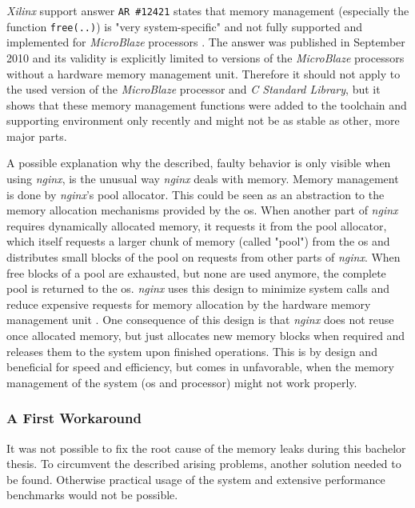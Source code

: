 \textit{Xilinx} support answer \texttt{AR \#12421} states that memory management (especially the function \texttt{free(..)}) is "very system-specific" and not fully supported and implemented for \textit{MicroBlaze} processors \cite{mbfree}. The answer was published in September 2010 and its validity is explicitly limited to versions of the \textit{MicroBlaze} processors without a hardware memory management unit. Therefore it should not apply to the used version of the \textit{MicroBlaze} processor and \textit{C Standard Library}, but it shows that these memory management functions were added to the toolchain and supporting environment only recently and might not be as stable as other, more major parts.

A possible explanation why the described, faulty behavior is only visible when using \textit{nginx}, is the unusual way \textit{nginx} deals with memory. Memory management is done by \textit{nginx}'s pool allocator. This could be seen as an abstraction to the memory allocation mechanisms provided by the \gls{os}. When another part of \textit{nginx} requires dynamically allocated memory, it requests it from the pool allocator, which itself requests a larger chunk of memory (called "pool") from the \gls{os} and distributes small blocks of the pool on requests from other parts of \textit{nginx}. When free blocks of a pool are exhausted, but none are used anymore, the complete pool is returned to the \gls{os}. \textit{nginx} uses this design to minimize system calls and reduce expensive requests for memory allocation by the hardware memory management unit \cite{aosa}. One consequence of this design is that \textit{nginx} does not reuse once allocated memory, but just allocates new memory blocks when required and releases them to the system upon finished operations. This is by design and beneficial for speed and efficiency, but comes in unfavorable, when the memory management of the system (\gls{os} and processor) might not work properly.
\\

\subsubsection{A First Workaround}

It was not possible to fix the root cause of the memory leaks during this bachelor thesis. To circumvent the described arising problems, another solution needed to be found. Otherwise practical usage of the system and extensive performance benchmarks would not be possible.

